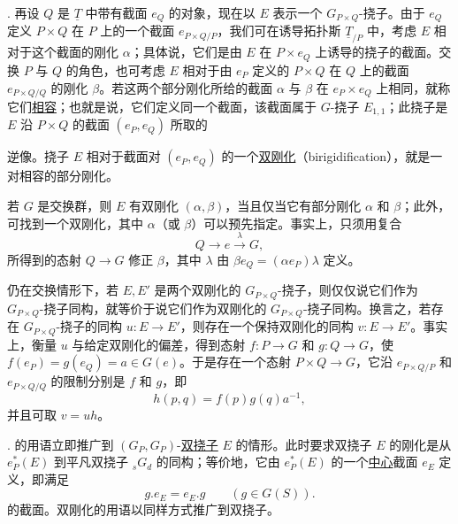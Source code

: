 . 再设 $Q$ 是 $\underline T$ 中带有截面 $e_Q$ 的对象，现在以 $E$ 表示一个 $G_{P\times Q}$-挠子。由于 $e_Q$ 定义 $P\times Q$ 在 $P$ 上的一个截面 $e_{P\times Q/P}$，我们可在诱导拓扑斯 $\underline T_{/P}$ 中，考虑 $E$ 相对于这个截面的刚化 $\alpha$；具体说，它们是由 $E$ 在 $P\times e_Q$ 上诱导的挠子的截面。交换 $P$ 与 $Q$ 的角色，也可考虑 $E$ 相对于由 $e_P$ 定义的 $P\times Q$ 在 $Q$ 上的截面 $e_{P\times Q/Q}$ 的刚化 $\beta$。若这两个部分刚化所给的截面 $\alpha$ 与 $\beta$ 在 $e_P\times e_Q$ 上相同，就称它们\underline{相容}；也就是说，它们定义同一个截面，该截面属于 $G$-挠子 $E_{1,1}$；此挠子是 $E$ 沿 $P\times Q$ 的截面 $(e_P,e_Q)$ 所取的


逆像。挠子 $E$ 相对于截面对 $(e_P,e_Q)$ 的一个\underline{双刚化}（birigidification），就是一对相容的部分刚化。

若 $G$ 是交换群，则 $E$ 有双刚化 $(\alpha,\beta)$，当且仅当它有部分刚化 $\alpha$ 和 $\beta$；此外，可找到一个双刚化，其中 $\alpha$（或 $\beta$）可以预先指定。事实上，只须用复合
\[
 Q\longrightarrow e\xrightarrow{\lambda}G,
\]
所得到的态射 $Q\longrightarrow G$ 修正 $\beta$，其中 $\lambda$ 由 $\beta e_Q=(\alpha e_P)\lambda$ 定义。

仍在交换情形下，若 $E,E'$ 是两个双刚化的 $G_{P\times Q}$-挠子，则仅仅说它们作为 $G_{P\times Q}$-挠子同构，就等价于说它们作为双刚化的 $G_{P\times Q}$-挠子同构。换言之，若存在 $G_{P\times Q}$-挠子的同构 $u:E\longrightarrow E'$，则存在一个保持双刚化的同构 $v:E\longrightarrow E'$。事实上，衡量 $u$ 与给定双刚化的偏差，得到态射 $f:P\longrightarrow G$ 和 $g:Q\longrightarrow G$，使 $f(e_P)=g(e_Q)=a\in G(e)$。于是存在一个态射 $P\times Q\longrightarrow G$，它沿 $e_{P\times Q/P}$ 和 $e_{P\times Q/Q}$ 的限制分别是 $f$ 和 $g$，即
\[
 h(p,q)=f(p)g(q)a^{-1},
\]
并且可取 $v=uh$。

.  的用语立即推广到 $(G_P,G_P)$-\underline{双挠子} $E$ 的情形。此时要求双挠子 $E$ 的刚化是从 $e_P^*(E)$ 到平凡双挠子 ${}_sG_d$ 的同构；等价地，它由 $e_P^*(E)$ 的一个\underline{中心}截面 $e_E$ 定义，即满足
\[
 g.e_E=e_E.g\qquad(g\in G(S)).
\]
的截面。双刚化的用语以同样方式推广到双挠子。




